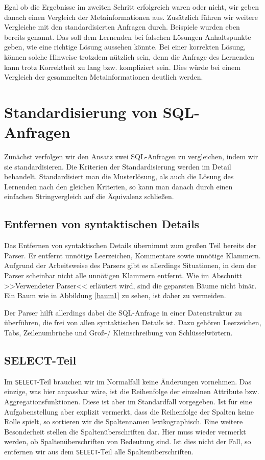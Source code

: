 Egal ob die Ergebnisse im zweiten Schritt erfolgreich waren oder nicht, wir geben danach einen Vergleich der Metainformationen aus. Zusätzlich führen wir weitere Vergleiche mit den standardisierten Anfragen durch. Beispiele wurden eben bereits genannt. Das soll dem Lernenden bei falschen Lösungen Anhaltspunkte geben, wie eine richtige Lösung aussehen könnte. Bei einer korrekten Lösung, können solche Hinweise trotzdem nützlich sein, denn die Anfrage des Lernenden kann trotz Korrektheit zu lang bzw. kompliziert sein. Dies würde bei einem Vergleich der gesammelten Metainformationen deutlich werden.

\section{Standardisierung von SQL-Anfragen}

Zunächst verfolgen wir den Ansatz zwei SQL-Anfragen zu vergleichen, indem wir sie standardisieren. Die Kriterien der Standardisierung werden im Detail behandelt. Standardisiert man die Musterlösung, als auch die Lösung des Lernenden nach den gleichen Kriterien, so kann man danach durch einen einfachen Stringvergleich auf die Äquivalenz schließen. 

\subsection{Entfernen von syntaktischen Details}

Das Entfernen von syntaktischen Details übernimmt zum großen Teil bereits der Parser. Er entfernt unnötige Leerzeichen, Kommentare sowie unnötige Klammern. Aufgrund der Arbeitsweise des Parsers gibt es allerdings Situationen, in dem der Parser scheinbar nicht alle unnötigen Klammern entfernt. Wie im Abschnitt >>Verwendeter Parser<< erläutert wird, sind die geparsten Bäume nicht binär. Ein Baum wie in Abbildung \ref{baum1} zu sehen, ist daher zu vermeiden. 

Der Parser hilft allerdings dabei die SQL-Anfrage in einer Datenstruktur zu überführen, die frei von allen syntaktischen Details ist. Dazu gehören Leerzeichen, Tabs, Zeilenumbrüche und Groß-/ Kleinschreibung von Schlüsselwörtern.

\subsection{SELECT-Teil}

Im \verb|SELECT|-Teil brauchen wir im Normalfall keine Änderungen vornehmen. Das einzige, was hier anpassbar wäre, ist die Reihenfolge der einzelnen Attribute bzw. Aggregationsfunktionen. Diese ist aber im Standardfall vorgegeben. Ist für eine Aufgabenstellung aber explizit vermerkt, dass die Reihenfolge der Spalten keine Rolle spielt, so sortieren wir die Spaltennamen lexikographisch. Eine weitere Besonderheit stellen die Spaltenüberschriften dar. Hier muss wieder vermerkt werden, ob Spaltenüberschriften von Bedeutung sind. Ist dies nicht der Fall, so entfernen wir aus dem \verb|SELECT|-Teil alle Spaltenüberschriften. 


